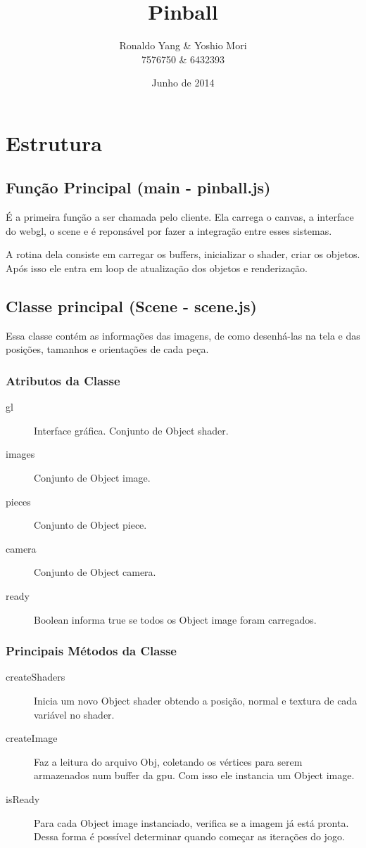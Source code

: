 \documentclass[a4paper,12pt]{article}
\title{Pinball}
\author{Ronaldo Yang \& Yoshio Mori
  \\
  \small 7576750 \& 6432393
}
\date{Junho de 2014} %
\begin{document}
\pagestyle{myheadings}
\maketitle
\newpage
\tableofcontents
\pagebreak

\section{Estrutura}
\subsection{Função Principal (main - pinball.js)}
É a primeira função a ser chamada pelo cliente. Ela carrega o canvas, a interface do webgl, o scene e é reponsável por fazer a integração entre esses sistemas.

A rotina dela consiste em carregar os buffers, inicializar o shader, criar os objetos. Após isso ele entra em loop de atualização dos objetos e renderização.

\subsection{Classe principal (Scene - scene.js)}
Essa classe contém as informações das imagens, de como desenhá-las na tela e das posições, tamanhos e orientações de cada peça.

\subsubsection{Atributos da Classe}
\begin{description}
\item[gl] Interface gráfica.
  \subitem[shaders] Conjunto de Object shader.
\item[images] Conjunto de Object image.
\item[pieces] Conjunto de Object piece.
\item[camera] Conjunto de Object camera.
\item[ready] Boolean informa true se todos os Object image foram carregados.
\end{description}
\subsubsection{Principais Métodos da Classe}
\begin{description}
\item[createShaders] Inicia um novo Object shader obtendo a posição, normal e textura de cada variável no shader.
\item[createImage] Faz a leitura do arquivo Obj, coletando os vértices para serem armazenados num buffer da gpu. Com isso ele instancia um Object image.
\item[isReady] Para cada Object image instanciado, verifica se a imagem já está pronta. Dessa forma é possível determinar quando começar as iterações do jogo.
\end{description}
\end{document}
